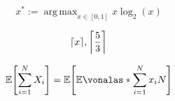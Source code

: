 \documentclass{article}
\DeclareMathOperator*{\argmax}{arg\,max}
\DeclarePairedDelimiter{\ceil}{\lceil}{\rceil}
\DeclarePairedDelimiter{\szogletes}{[}{]}
\newcommand{\VE}[1]{\mathbb{E}\szogletes*{#1}}
\newcommand{\FVE}[2]{\mathbb{E}\vonalas*{#1}{#2}}
\begin{document}
\[x^* := \argmax_{x\in[0, 1]} x \log_2(x)\]

\[\ceil{x}, \ceil*{\frac{5}{3}}\]

\[\VE{\sum_{i=1}^{N}{X_i}} = \VE{\FVE{\sum_{i=1}^{N}{x_i}}{N}}\]
\end{document}

